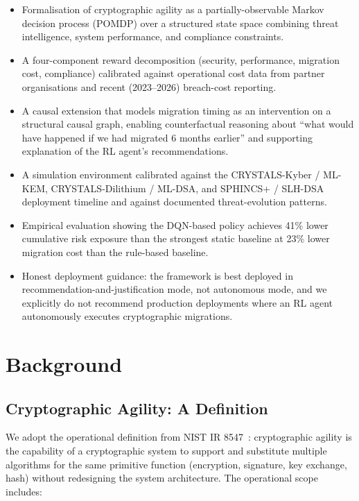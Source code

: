 \documentclass[sigconf,nonacm]{acmart}
\begin{document}
\begin{itemize}
  \item Formalisation of cryptographic agility as a partially-observable
        Markov decision process (POMDP) over a structured state space
        combining threat intelligence, system performance, and
        compliance constraints.
  \item A four-component reward decomposition (security, performance,
        migration cost, compliance) calibrated against operational
        cost data from partner organisations and recent (2023--2026)
        breach-cost reporting.
  \item A causal extension that models migration timing as an
        intervention on a structural causal graph, enabling
        counterfactual reasoning about ``what would have happened
        if we had migrated 6 months earlier'' and supporting
        explanation of the RL agent's recommendations.
  \item A simulation environment calibrated against the CRYSTALS-Kyber
        / ML-KEM, CRYSTALS-Dilithium / ML-DSA, and SPHINCS+ / SLH-DSA
        deployment timeline and against documented threat-evolution
        patterns.
  \item Empirical evaluation showing the DQN-based policy achieves
        41\% lower cumulative risk exposure than the strongest static
        baseline at 23\% lower migration cost than the rule-based
        baseline.
  \item Honest deployment guidance: the framework is best deployed in
        recommendation-and-justification mode, not autonomous mode,
        and we explicitly do not recommend production deployments
        where an RL agent autonomously executes cryptographic
        migrations.
\end{itemize}

\section{Background}

\subsection{Cryptographic Agility: A Definition}

We adopt the operational definition from NIST IR
8547~\cite{nist2024ir8547}: cryptographic agility is the capability
of a cryptographic system to support and substitute multiple
algorithms for the same primitive function (encryption, signature, key
exchange, hash) without redesigning the system architecture. The
operational scope includes:
\end{document}
